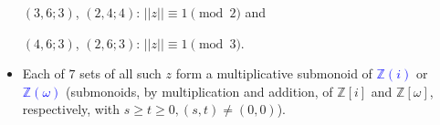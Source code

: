 \documentclass{beamer}
\begin{document}
\begin{frame}
\begin{itemize}
 $(3,6;3)$, $(2,4;4)$:     $||z||\equiv 1\pmod 2$ and
 
 $(4,6;3)$, $(2,6;3)$:     $||z||\equiv 1 \pmod 3$. 


\item Each of $7$ sets of all such $z$ form a multiplicative submonoid of 
\textcolor{blue}{$\mathbb{Z}(i)$} or \textcolor{blue}{$\mathbb{Z}(\omega)$}  
 (submonoids, by multiplication and  addition, of  $\mathbb{Z}[i]$ and 
$\mathbb{Z}[\omega]$, respectively,   with $s\ge t\ge 0, (s,t)\neq (0,0)$).
  
\end{itemize}
\end{frame}
\end{document}
